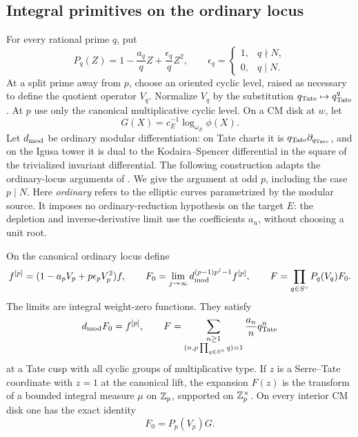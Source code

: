 \subsection{Integral primitives on the ordinary locus}

For every rational prime \(q\), put
\[
 P_q(Z)=1-\frac{a_q}{q}Z+\frac{\epsilon_q}{q}Z^2,\qquad
 \epsilon_q=
 \begin{cases}
 1,&q\nmid N,\\
 0,&q\mid N.
 \end{cases}
\]
At a split prime away from \(p\), choose an oriented cyclic level,
raised as necessary to define the quotient operator \(V_q\).
Normalize \(V_q\) by the substitution \(q_{\rm Tate}\mapsto
q_{\rm Tate}^q\).  At \(p\) use only the canonical multiplicative
cyclic level.  On a CM disk at \(w\), let
\[
 G(X)=c_E^{-1}\log_{\omega_E}\phi(X).
\]
Let \(d_{\rm mod}\) be ordinary modular differentiation: on Tate
charts it is \(q_{\rm Tate}\partial_{q_{\rm Tate}}\), and on the
Igusa tower it is dual to the Kodaira--Spencer differential in the
square of the trivialized invariant differential.
The following construction adapts the ordinary-locus arguments of
\cite[Section~8, \emph{Integral depleted primitive},
\emph{Support of the disk measure}, and
\emph{The exact logarithmic primitive}]{B}.
We give the argument at odd \(p\), including the case \(p\mid N\).
Here \emph{ordinary} refers to the elliptic curves parametrized by
the modular source.  It imposes no ordinary-reduction hypothesis
on the target \(E\): the depletion and inverse-derivative limit
use the coefficients \(a_n\), without choosing a unit root.

\begin{proposition}\label{pair:primitive}
On the canonical ordinary locus define
\[
 f^{[p]}=(1-a_pV_p+p\epsilon_pV_p^2)f,\qquad
 F_0=\lim_{j\to\infty}d_{\rm mod}^{(p-1)p^j-1}f^{[p]},\qquad
 F=\prod_{q\in S^\circ}P_q(V_q)F_0.
\]
The limits are integral weight-zero functions.  They satisfy
\[
 d_{\rm mod}F_0=f^{[p]},\qquad
 F=\sum_{\substack{n\ge1\\(n,p\prod_{q\in S^\circ}q)=1}}
          \frac{a_n}{n}q_{\rm Tate}^n
\]
at a Tate cusp with all cyclic groups of multiplicative type.
If \(z\) is a Serre--Tate coordinate with \(z=1\) at the canonical
lift, the expansion \(F(z)\) is the transform of a bounded integral
measure \(\mu\) on \(\mathbb Z_p\), supported on \(\mathbb Z_p^\times\).
On every interior CM disk one has the exact identity
\begin{equation}
 F_0=P_p(V_p)G.
 \tag{9}\label{eq:source-9}
\end{equation}
\end{proposition}

